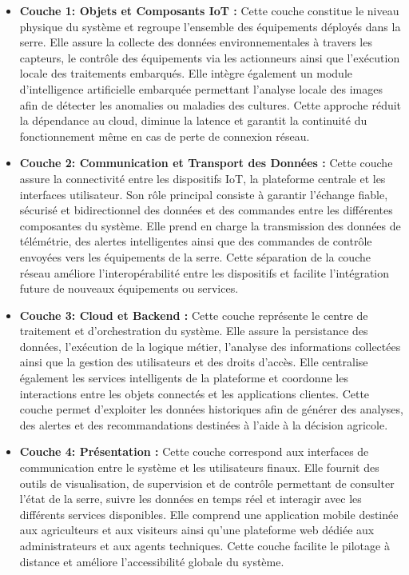 \begin{itemize}
	
	\item \textbf{Couche 1: Objets et Composants IoT :}  
	Cette couche constitue le niveau physique du système et regroupe l’ensemble des équipements déployés dans la serre. Elle assure la collecte des données environnementales à travers les capteurs, le contrôle des équipements via les actionneurs ainsi que l’exécution locale des traitements embarqués. Elle intègre également un module d’intelligence artificielle embarquée permettant l’analyse locale des images afin de détecter les anomalies ou maladies des cultures. Cette approche réduit la dépendance au cloud, diminue la latence et garantit la continuité du fonctionnement même en cas de perte de connexion réseau.
	
	\item \textbf{Couche 2: Communication et Transport des Données :}  
	Cette couche assure la connectivité entre les dispositifs IoT, la plateforme centrale et les interfaces utilisateur. Son rôle principal consiste à garantir l’échange fiable, sécurisé et bidirectionnel des données et des commandes entre les différentes composantes du système. Elle prend en charge la transmission des données de télémétrie, des alertes intelligentes ainsi que des commandes de contrôle envoyées vers les équipements de la serre. Cette séparation de la couche réseau améliore l’interopérabilité entre les dispositifs et facilite l’intégration future de nouveaux équipements ou services.
	
	\item \textbf{Couche 3: Cloud et Backend :}  
	Cette couche représente le centre de traitement et d’orchestration du système. Elle assure la persistance des données, l’exécution de la logique métier, l’analyse des informations collectées ainsi que la gestion des utilisateurs et des droits d’accès. Elle centralise également les services intelligents de la plateforme et coordonne les interactions entre les objets connectés et les applications clientes. Cette couche permet d’exploiter les données historiques afin de générer des analyses, des alertes et des recommandations destinées à l’aide à la décision agricole.
	
	\item \textbf{Couche 4: Présentation :}  
	Cette couche correspond aux interfaces de communication entre le système et les utilisateurs finaux. Elle fournit des outils de visualisation, de supervision et de contrôle permettant de consulter l’état de la serre, suivre les données en temps réel et interagir avec les différents services disponibles. Elle comprend une application mobile destinée aux agriculteurs et aux visiteurs ainsi qu’une plateforme web dédiée aux administrateurs et aux agents techniques. Cette couche facilite le pilotage à distance et améliore l’accessibilité globale du système.
	
\end{itemize}

